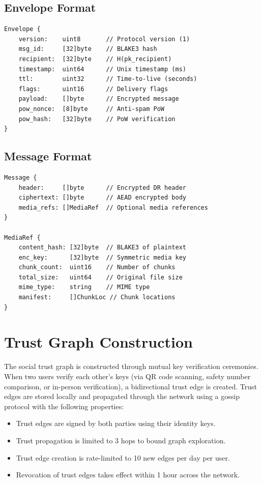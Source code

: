 \documentclass[11pt,a4paper]{article}
\begin{document}
\subsection{Envelope Format}

\begin{lstlisting}[basicstyle=\small\ttfamily,frame=single,caption={DSF Envelope Binary Format}]
Envelope {
    version:    uint8       // Protocol version (1)
    msg_id:     [32]byte    // BLAKE3 hash
    recipient:  [32]byte    // H(pk_recipient)
    timestamp:  uint64      // Unix timestamp (ms)
    ttl:        uint32      // Time-to-live (seconds)
    flags:      uint16      // Delivery flags
    payload:    []byte      // Encrypted message
    pow_nonce:  [8]byte     // Anti-spam PoW
    pow_hash:   [32]byte    // PoW verification
}
\end{lstlisting}

\subsection{Message Format}

\begin{lstlisting}[basicstyle=\small\ttfamily,frame=single,caption={Encrypted Message Format}]
Message {
    header:     []byte      // Encrypted DR header
    ciphertext: []byte      // AEAD encrypted body
    media_refs: []MediaRef  // Optional media references
}

MediaRef {
    content_hash: [32]byte  // BLAKE3 of plaintext
    enc_key:      [32]byte  // Symmetric media key
    chunk_count:  uint16    // Number of chunks
    total_size:   uint64    // Original file size
    mime_type:    string    // MIME type
    manifest:     []ChunkLoc // Chunk locations
}
\end{lstlisting}

\section{Trust Graph Construction}

The social trust graph is constructed through mutual key verification ceremonies. When two users verify each other's keys (via QR code scanning, safety number comparison, or in-person verification), a bidirectional trust edge is created. Trust edges are stored locally and propagated through the network using a gossip protocol with the following properties:

\begin{itemize}
    \item Trust edges are signed by both parties using their identity keys.
    \item Trust propagation is limited to 3 hops to bound graph exploration.
    \item Trust edge creation is rate-limited to 10 new edges per day per user.
    \item Revocation of trust edges takes effect within 1 hour across the network.
\end{itemize}
\end{document}
